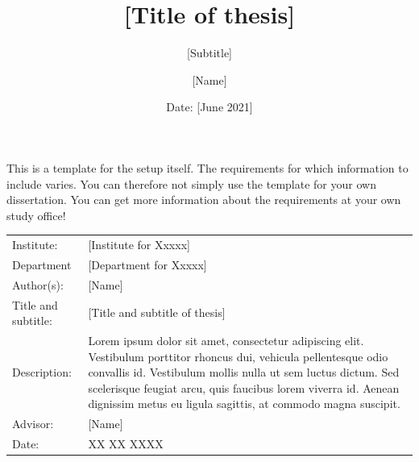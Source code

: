 \documentclass[12pt]{article}
\author{[Name]}
\title{[Title of thesis]}
\subtitle{[Subtitle]}
\date{Date: {[June 2021]}}
\begin{document}
\maketitle

\onehalfspacing

\noindent This is a template for the setup itself. The requirements for which information to include varies. You can therefore not simply use the template for your own dissertation. You can get more information about the requirements at your own study office!
\begin{table}[h]
\def\arraystretch{1.5}
\begin{tabularx}{\textwidth}{l X}
Institute: & {[Institute for Xxxxx]}  \\
Department & {[Department for Xxxxx]} \\
Author(s): & {[Name]} \\
Title and subtitle: & {[Title and subtitle of thesis]} \\
Description: & Lorem ipsum dolor sit amet, consectetur adipiscing elit. Vestibulum porttitor rhoncus dui, vehicula pellentesque odio convallis id. Vestibulum mollis nulla ut sem luctus dictum. Sed scelerisque feugiat arcu, quis faucibus lorem viverra id. Aenean dignissim metus eu ligula sagittis, at commodo magna suscipit. \\
Advisor: & {[Name]} \\
Date: & XX XX XXXX
\end{tabularx}
\end{table}
\newpage

\tableofcontents
\newpage
\end{document}
